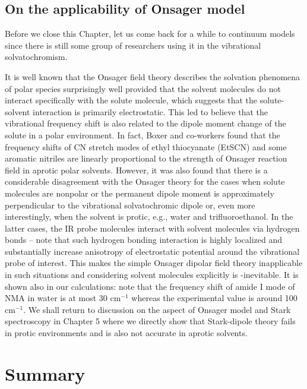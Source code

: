 \documentclass[a4paper,titlepage,twoside,fleqn,12pt]{book}
\begin{document}
\begin{refsection}
\subsection{On the applicability of Onsager model}

Before we close this Chapter, let us come back for a while to
continuum models since there is still some group of researchers
using it in the vibrational solvatochromism. 

It is well known that the Onsager field theory describes
the solvation phenomena of polar species surprisingly
well provided that the solvent molecules do not interact
specifically with the solute molecule, which suggests that the
solute\hyp{}solvent interaction is primarily electrostatic. This led
to believe that the vibrational frequency shift is also related
to the dipole moment change of the solute in a polar
environment. In fact, Boxer and co\hyp{}workers found that the
frequency shifts of CN stretch modes of ethyl thiocyanate
(EtSCN)%
and some aromatic nitriles%
are linearly proportional
to the strength of Onsager reaction field in aprotic polar
solvents. However, it was also found that there is a considerable
disagreement with the Onsager theory for the cases
when solute molecules are nonpolar or the permanent dipole
moment is approximately perpendicular to the vibrational
solvatochromic dipole%
or, even more interestingly, when
the solvent is protic, e.g., water and trifluoroethanol.%
In
the latter cases, the IR probe molecules interact with solvent
molecules via hydrogen bonds -- note that such hydrogen bonding
interaction is highly localized and substantially
increase anisotropy of electrostatic potential around the vibrational
probe of interest. This makes the simple Onsager
dipolar field theory inapplicable in such situations and considering
solvent molecules explicitly is \hyp{inevitable}. It is shown also in our 
calculations: note that the frequency shift of amide I mode of NMA in water
is at most 30 cm$^{-1}$ whereas the experimental value
is around 100 cm$^{-1}$. We shall return to discussion
on the aspect of Onsager model and Stark spectroscopy in Chapter 5 
where we directly show that Stark\hyp{}dipole
theory fails in protic environments and is also not accurate in aprotic solvents.

\section{Summary}


\end{refsection}
\end{document}
